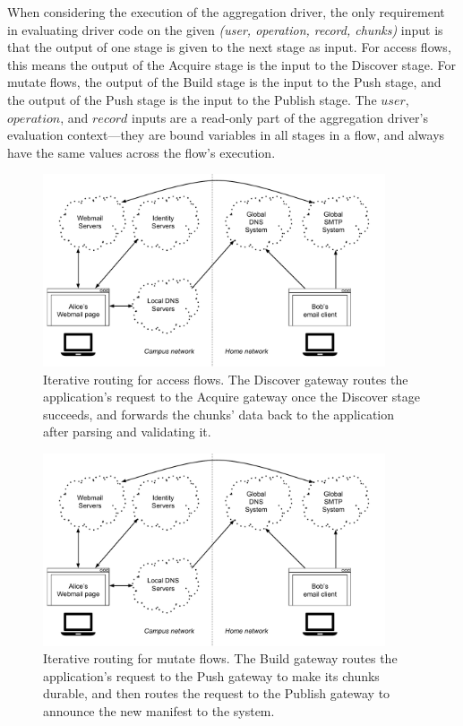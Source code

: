When considering the execution of the aggregation driver, the only requirement in evaluating
driver code on the given \textit{(user, operation, record, chunks)} input is
that the output of one stage is given to the next stage as input.  For access
flows, this means the output of the Acquire stage is the input to the Discover
stage.  For mutate flows, the output of the Build stage is the input to the Push
stage, and the output of the Push stage is the input to the Publish stage.  The
$user$, $operation$, and $record$ inputs are a read-only part of the aggregation driver's
evaluation context---they are bound variables in all stages in a flow, and
always have the same values across the flow's execution.

\begin{figure}[h!]
   \centering
   \includegraphics[width=0.9\textwidth,page=9]{figures/dissertation-figures}
   \caption{Iterative routing for access flows.  The Discover gateway routes the
   application's request to the Acquire gateway once the Discover stage
   succeeds, and forwards the chunks' data back to the application after parsing
   and validating it.}
   \label{fig:chap2-access-flow-protocol}
\end{figure}

\begin{figure}[h!]
   \centering
   \includegraphics[width=0.9\textwidth,page=10]{figures/dissertation-figures}
   \caption{Iterative routing for mutate flows.  The Build gateway routes the
   application's request to the Push gateway to make its chunks durable, and
   then routes the request to the Publish gateway to announce the new manifest
   to the system.}
   \label{fig:chap2-mutate-flow-protocol}
\end{figure}

